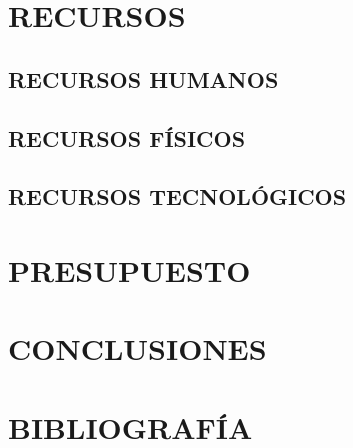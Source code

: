 \documentclass[stu,12pt,floatsintext]{apa7}
\begin{document}
	\section{RECURSOS}
	\subsection{RECURSOS HUMANOS}
	\subsection{RECURSOS FÍSICOS}
	\subsection{RECURSOS TECNOLÓGICOS}
	
	\section{PRESUPUESTO}
	\section{CONCLUSIONES}
	\section{BIBLIOGRAFÍA}
	\renewcommand\refname{Referencias}
	
	
\end{document}
